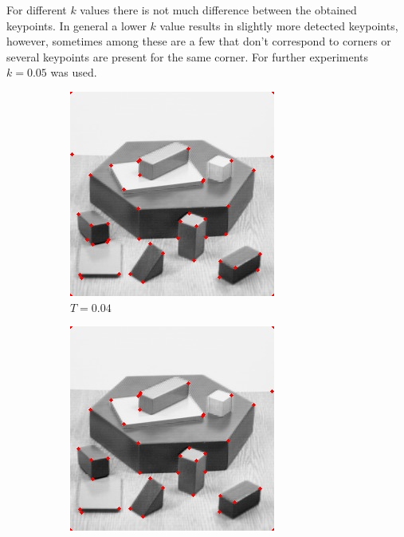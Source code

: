 \documentclass[10pt,a4paper,twoside]{article}
\newcommand{\sweepsize}{0.26}
\begin{document}
For different $k$ values there is not much difference between the obtained
keypoints. In general a lower $k$ value results in slightly more detected
keypoints, however, sometimes among these are a few that don't correspond to
corners or several keypoints are present for the same corner. For further experiments $k=0.05$ was used.
\begin{figure}[h]
    \centering

    \begin{subfigure}{\sweepsize\textwidth}
    \includegraphics[width=0.9\linewidth, height=0.9\linewidth]{sweep_blocks/blocks_10_004_1e-05.jpg} 
    \caption{$T=0.04$}
    \end{subfigure}
    \begin{subfigure}{\sweepsize\textwidth}
    \includegraphics[width=0.9\linewidth, height=0.9\linewidth]{sweep_blocks/blocks_10_005_1e-05.jpg} 

\end{subfigure}
\end{figure}
\end{document}

